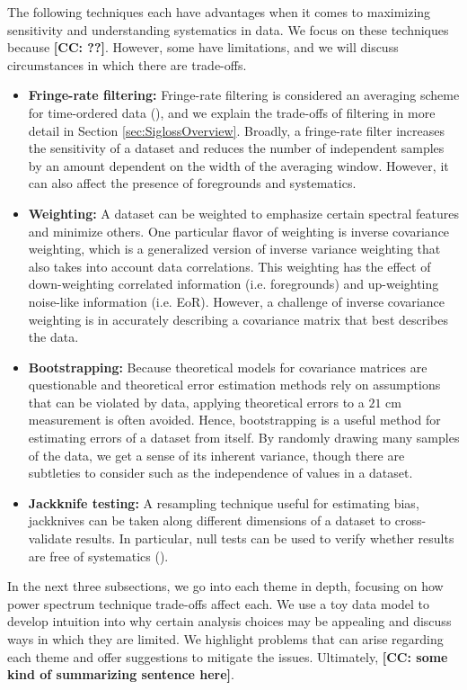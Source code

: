 \documentclass[preprint2,numberedappendix,tighten]{aastex6}  %
\newcommand{\cc}[1]{{\color{purple} \textbf{[CC: #1]}}}
\begin{document}
The following techniques each have advantages when it comes to maximizing sensitivity and understanding systematics in data. We focus on these techniques because \cc{??}. However, some have limitations, and we will discuss circumstances in which there are trade-offs.
\begin{itemize}
\item \textbf{Fringe-rate filtering:} Fringe-rate filtering is considered an averaging scheme for time-ordered data (\citealt{parsons_et_al2016}), and we explain the trade-offs of filtering in more detail in Section \ref{sec:SiglossOverview}. Broadly, a fringe-rate filter increases the sensitivity of a dataset and reduces the number of independent samples by an amount dependent on the width of the averaging window. However, it can also affect the presence of foregrounds and systematics. 
\item \textbf{Weighting:} A dataset can be weighted to emphasize certain spectral features and minimize others. One particular flavor of weighting is inverse covariance weighting, which is a generalized version of inverse variance weighting that also takes into account data correlations. This weighting has the effect of down-weighting correlated information (i.e. foregrounds) and up-weighting noise-like information (i.e. EoR). However, a challenge of inverse covariance weighting is in accurately describing a covariance matrix that best describes the data. 
\item \textbf{Bootstrapping:} Because theoretical models for covariance matrices are questionable and theoretical error estimation methods rely on assumptions that can be violated by data, applying theoretical errors to a $21$ cm measurement is often avoided. Hence, bootstrapping is a useful method for estimating errors of a dataset from itself. By randomly drawing many samples of the data, we get a sense of its inherent variance, though there are subtleties to consider such as the independence of values in a dataset.
\item \textbf{Jackknife testing:} A resampling technique useful for estimating bias, jackknives can be taken along different dimensions of a dataset to cross-validate results. In particular, null tests can be used to verify whether results are free of systematics (\citealt{keating_et_al2016}).
\end{itemize}

In the next three subsections, we go into each theme in depth, focusing on how power spectrum technique trade-offs affect each. We use a toy data model to develop intuition into why certain analysis choices may be appealing and discuss ways in which they are limited. We highlight problems that can arise regarding each theme and offer suggestions to mitigate the issues. Ultimately, \cc{some kind of summarizing sentence here}.
\end{document}
